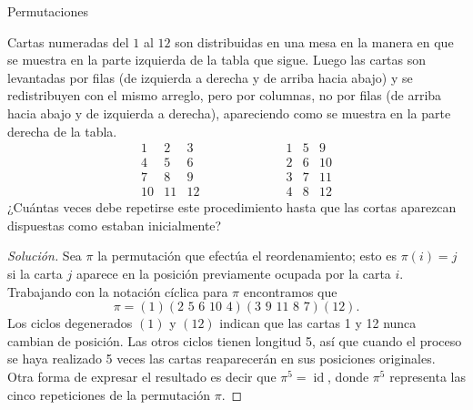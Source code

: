 \begin{section}{Permutaciones}
\begin{ejemplo}\label{cartas} Cartas numeradas del $1$ al $12$ son distribuidas en una mesa en la manera en que se muestra en la parte izquierda de la tabla que sigue. Luego las cartas son levantadas  por filas (de izquierda a derecha y de arriba hacia abajo) y se redistribuyen con el mismo arreglo, pero por columnas, no por filas (de arriba hacia abajo y de izquierda a derecha), apareciendo como se muestra en la parte derecha de la tabla.
$$
\begin{matrix} 1& 2& 3\\
4 &5 &6 \\
7 &8 & 9\\
10 &11 & 12 \end{matrix}\qquad \qquad\qquad
\begin{matrix}1 &5 &9 \\
2 &6 &10 \\
3& 7& 11\\
4&8 & 12 \end{matrix}
$$
¿Cuántas veces debe repetirse este procedimiento hasta que las cortas aparezcan dispuestas como estaban inicialmente?
\end{ejemplo}
\begin{proof}[Solución] Sea $\pi$ la permutación que efectúa el reordenamiento; esto es $\pi(i) =j$ si la carta $j$ aparece en la posición previamente ocupada por la carta $i$. Trabajando con la notación cíclica para $\pi$ encontramos que
$$
\pi=(1)(2\,\,5\,\,6\,\,10\,\,4)(3\,\,9\,\,11\,\,8\,\,7)(12).
$$
Los ciclos degenerados $(1)$ y $(12)$ indican que las cartas 1 y 12 nunca cambian de posición. Las otros ciclos tienen longitud 5, así que cuando el proceso se haya realizado 5 veces las cartas
reaparecerán en sus posiciones originales. Otra forma de expresar el resultado es decir que $\pi^5= \operatorname{id}$, donde $\pi^5$ representa las cinco repeticiones de la permutación $\pi$.
\end{proof}
\end{section}


